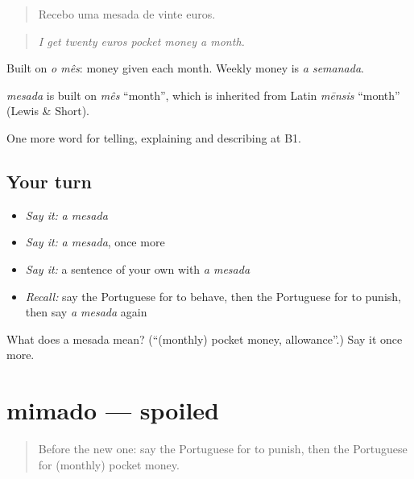 \begin{quote}
Recebo uma mesada de vinte euros.
\end{quote}

\begin{quote}
\emph{I get twenty euros pocket money a month.}
\end{quote}

Built on \emph{o mês}: money given each month. Weekly money is \emph{a semanada}.

\begin{cousinweb}
\emph{mesada} is built on \emph{mês} \textquotedblleft{}month\textquotedblright{}, which is inherited from Latin \emph{mēnsis} \textquotedblleft{}month\textquotedblright{} (Lewis \& Short).
\end{cousinweb}

\begin{grammarlens}[title={What you've built}]
One more word for telling, explaining and describing at B1.
\end{grammarlens}

\subsection*{Your turn}
\begin{itemize}
\raggedright
  \item \emph{Say it:} \emph{a mesada}
  \item \emph{Say it:} \emph{a mesada}, once more
  \item \emph{Say it:} a sentence of your own with \emph{a mesada}
  \item \emph{Recall:} say the Portuguese for to behave, then the Portuguese for to punish, then say \emph{a mesada} again
\end{itemize}

\begin{tcolorbox}[breakable,colback=teal!4,colframe=teal!35!black,title={Before you move on}]
What does a mesada mean? (\textquotedblleft{}(monthly) pocket money, allowance\textquotedblright{}.) Say it once more.
\end{tcolorbox}
\section[mimado]{mimado — spoiled}

\label{lesson:PT-C495-mimado}



\begin{quote}
Before the new one: say the Portuguese for to punish, then the Portuguese for (monthly) pocket money.
\end{quote}

